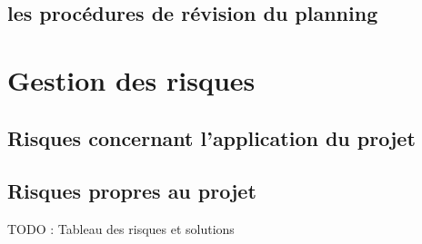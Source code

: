 \subsection{les procédures de révision du planning}
\section{Gestion des risques}
\subsection{Risques concernant l'application du projet}
\subsection{Risques propres au projet}
TODO : Tableau des risques et solutions


